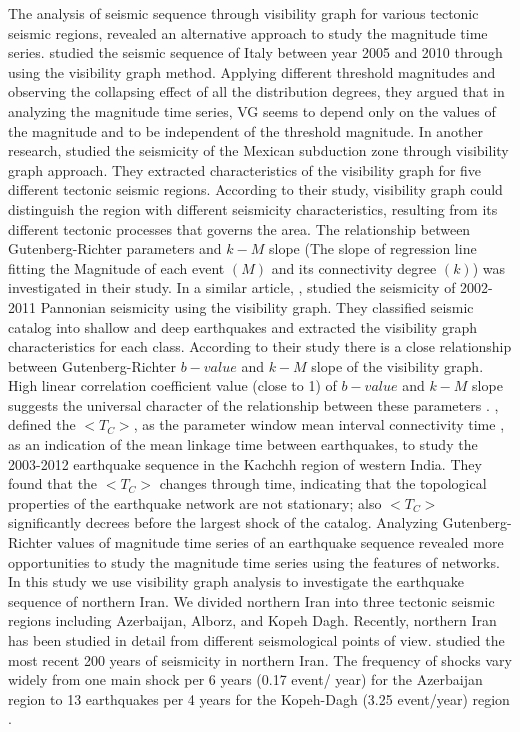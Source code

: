 \noindent
The analysis of seismic sequence through visibility graph for various tectonic seismic regions, revealed an alternative approach to study the magnitude time series. \citet{Telesca2012} studied the seismic sequence of Italy between year 2005 and 2010 through using the visibility graph method. Applying different threshold magnitudes and observing the collapsing effect of all the distribution degrees, they argued that in analyzing the magnitude time series, VG seems to depend only on the values of the magnitude and to be independent of the threshold magnitude. In another research, \citet{Telesca2013} studied the seismicity of the Mexican subduction zone through visibility graph approach. They extracted characteristics of the visibility graph for five different tectonic seismic regions.  According to their study, visibility graph could distinguish the region with different seismicity characteristics, resulting from its different tectonic processes that governs the area. The relationship between Gutenberg-Richter parameters and $k-M$ slope (The slope of regression line fitting the Magnitude  of each event $(M)$ and its connectivity degree $(k)$) was investigated in their study. In a similar article, \citet{Telesca2014}, studied the seismicity of 2002-2011 Pannonian seismicity using the visibility graph. They classified seismic catalog into shallow and deep earthquakes and extracted the visibility graph characteristics for each class. According to their study there is a close relationship between Gutenberg-Richter $b-value$ and $k-M$ slope of the visibility graph. High linear correlation coefficient value (close to 1) of $b-value$ and $k-M$ slope suggests the universal character of the relationship between these parameters \citep{Telesca2014}.  \citet{Telesca2016} , defined the $ <T_C>$, as the parameter window mean interval connectivity time ,  as an indication of the mean linkage time between earthquakes, to study the 2003-2012 earthquake sequence in the Kachchh region of western India. They found that the $<T_C>$ changes through time, indicating that the topological properties of the earthquake network are not stationary; also $<T_C>$ significantly decrees before the largest shock of the catalog. Analyzing Gutenberg-Richter values of  magnitude time series of an earthquake sequence revealed more opportunities to study the magnitude time series using the features of networks. \\

\noindent
In this study we use visibility graph analysis to investigate the earthquake sequence of northern Iran. We divided northern Iran into three tectonic seismic regions including Azerbaijan, Alborz, and Kopeh Dagh.  Recently, northern Iran has been studied in detail from different seismological points of view. \citet{Nemati2015} studied the most recent 200 years of seismicity in northern Iran. The frequency of shocks vary widely from one main shock per 6 years (0.17 event/ year) for the Azerbaijan region to 13 earthquakes per 4 years for the Kopeh-Dagh (3.25 event/year) region \citep{Nemati2015} . \\

